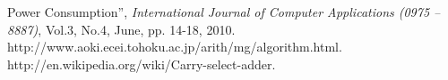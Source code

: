 \begin{thebibliography}{1}
Power Consumption'', \emph{International Journal of Computer Applications (0975 – 8887)}, Vol.3, No.4, June, pp. 14-18, 2010.
%
%
http://www.aoki.ecei.tohoku.ac.jp/arith/mg/algorithm.html.
%
http://en.wikipedia.org/wiki/Carry-select-adder.
%

\end{thebibliography}
